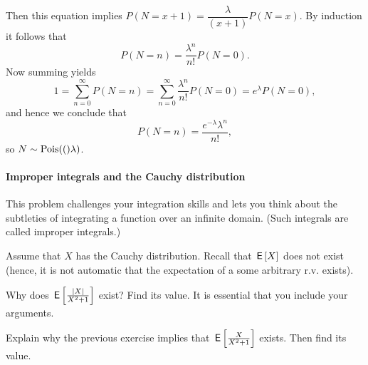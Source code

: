 \documentclass[assignments]{subfiles}
\begin{document}
\begin{exercise}
{\begin{solution}
 Then this equation implies $P(N=x+1) = \dfrac{\lambda}{(x+1)} P(N=x)$. By induction it follows that $$P(N = n) = \frac{\lambda^n}{n!} P(N=0).$$
 Now summing yields $$1 = \sum_{n=0}^\infty P(N=n) = \sum_{n=0}^\infty \frac{\lambda^n}{n!} P(N = 0) = e^{\lambda} P(N=0),$$
and hence we conclude that
$$P(N = n) = \frac{e^{-\lambda}\lambda^n}{n!},$$
so $N \sim \mathrm{Pois}(()\lambda)$.
\end{solution}
}
\end{exercise}



\paragraph{Improper integrals and the Cauchy distribution}

This problem challenges your integration skills and lets you think about the subtleties of integrating a function over an infinite domain.
(Such integrals are called improper integrals.)

Assume that $X$ has the Cauchy distribution.
Recall that $\,\mathsf{E}\left[X\right]$ does not exist (hence, it is not automatic that the expectation of a some arbitrary r.v.
exists).
\begin{exercise}
Why does $\,\mathsf{E}\left[\frac{|X|}{X^2+1}\right]$ exist? Find its value. It is essential that you include your arguments.
\end{exercise}


\begin{exercise}
Explain why the previous exercise implies that $\,\mathsf{E}\left[\frac{X}{X^2+1}\right]$ exists. Then find its value.
\end{exercise}
\end{document}
